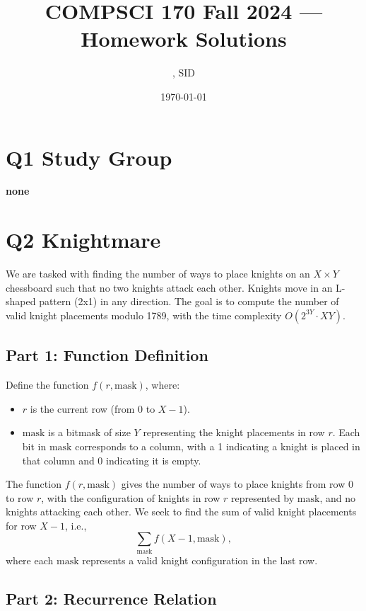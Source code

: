 \documentclass[11pt]{article}
\title{COMPSCI 170 Fall 2024 --- Homework \Homework Solutions}
\author{\Name, SID \SID}
\date{\today}
\begin{document}
\maketitle

\section*{Q1 Study Group}

\textbf{none}



\newpage


\section*{Q2 Knightmare}

We are tasked with finding the number of ways to place knights on an \( X \times Y \) chessboard such that no two knights attack each other. Knights move in an L-shaped pattern (2x1) in any direction. The goal is to compute the number of valid knight placements modulo 1789, with the time complexity \( O(2^{3Y} \cdot XY) \).

\subsection*{Part 1: Function Definition}

Define the function \( f(r, \text{mask}) \), where:
\begin{itemize}
    \item \( r \) is the current row (from 0 to \( X-1 \)).
    \item \( \text{mask} \) is a bitmask of size \( Y \) representing the knight placements in row \( r \). Each bit in \( \text{mask} \) corresponds to a column, with a 1 indicating a knight is placed in that column and 0 indicating it is empty.
\end{itemize}

The function \( f(r, \text{mask}) \) gives the number of ways to place knights from row 0 to row \( r \), with the configuration of knights in row \( r \) represented by \( \text{mask} \), and no knights attacking each other. We seek to find the sum of valid knight placements for row \( X-1 \), i.e.,
\[
\sum_{\text{mask}} f(X-1, \text{mask}),
\]
where each \( \text{mask} \) represents a valid knight configuration in the last row.

\subsection*{Part 2: Recurrence Relation}
\end{document}
